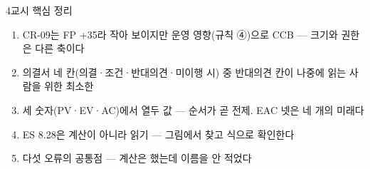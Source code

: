 \begin{frame}{4교시 핵심 정리}
\begin{enumerate}
\item CR-09는 FP +35라 작아 보이지만 운영 영향(규칙 ④)으로 CCB — 크기와 권한은 다른 축이다
\item 의결서 네 칸(의결·조건·반대의견·미이행 시) 중 반대의견 칸이 나중에 읽는 사람을 위한 최소한
\item 세 숫자(PV·EV·AC)에서 열두 값 — 순서가 곧 전제. EAC 넷은 네 개의 미래다
\item ES 8.28은 계산이 아니라 읽기 — 그림에서 찾고 식으로 확인한다
\item 다섯 오류의 공통점 — 계산은 했는데 이름을 안 적었다
\end{enumerate}
\end{frame}
